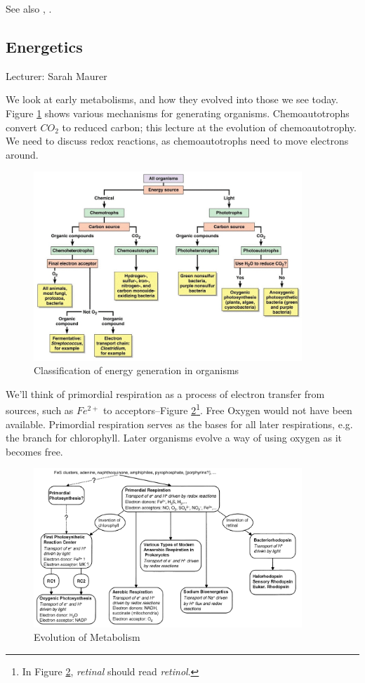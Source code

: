 \documentclass[]{article}
\begin{document}
See also \cite{bar2011survey}, \cite{fuchs2011alternative}.

\subsection{Energetics}

Lecturer: Sarah Maurer

We look at early metabolisms, and how they evolved into those we see today. 
Figure \ref{fig:ClassificationEnergyGeneration} shows various mechanisms for generating organisms. Chemoautotrophs convert $CO_2$ to reduced carbon; this lecture at the evolution of chemoautotrophy. We need to discuss redox reactions, as chemoautotrophs need to move electrons around.

\begin{figure}[H]
	\caption{Classification of energy generation in organisms} \label{fig:ClassificationEnergyGeneration} 
	\includegraphics[width=0.9\textwidth]{ClassificationEnergyGeneration}
\end{figure}

We'll think of primordial respiration as a process of electron transfer from sources, such as $Fe^{2+}$ to acceptors--Figure \ref{fig:EvolutionMetabolism}\footnote{In Figure \ref{fig:EvolutionMetabolism}, \textit{retinal} should read \textit{retinol}.}. Free Oxygen would not have been available. Primordial respiration serves as the bases for all later respirations, e.g. the branch for chlorophyll. Later organisms evolve a way of using oxygen as it becomes free.
\begin{figure}[H]
	\caption{Evolution of Metabolism} \label{fig:EvolutionMetabolism} 
	\includegraphics[width=0.9\textwidth]{EvolutionMetabolism}
\end{figure}
\end{document}

